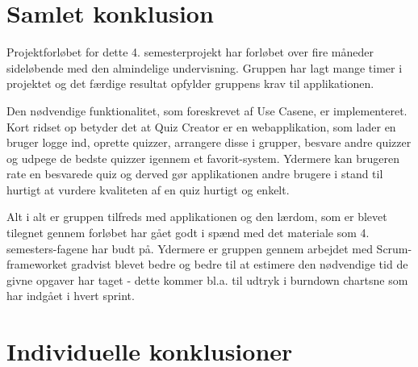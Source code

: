 \chapter{Samlet konklusion}
Projektforløbet for dette 4. semesterprojekt har forløbet over fire måneder sideløbende med den almindelige undervisning. Gruppen har lagt mange timer i projektet og det færdige resultat opfylder gruppens krav til applikationen.

Den nødvendige funktionalitet, som foreskrevet af Use Casene, er implementeret. Kort ridset op betyder det at Quiz Creator er en webapplikation, som lader en bruger logge ind, oprette quizzer, arrangere disse i grupper, besvare andre quizzer og udpege de bedste quizzer igennem et favorit-system. Ydermere kan brugeren rate en besvarede quiz og derved gør applikationen andre brugere i stand til hurtigt at vurdere kvaliteten af en quiz hurtigt og enkelt.

Alt i alt er gruppen tilfreds med applikationen og den lærdom, som er blevet tilegnet gennem forløbet har gået godt i spænd med det materiale som 4. semesters-fagene har budt på. Ydermere er gruppen gennem arbejdet med Scrum-frameworket gradvist blevet bedre og bedre til at estimere den nødvendige tid de givne opgaver har taget - dette kommer bl.a. til udtryk i burndown chartsne som har indgået i hvert sprint. 

\chapter{Individuelle konklusioner}









